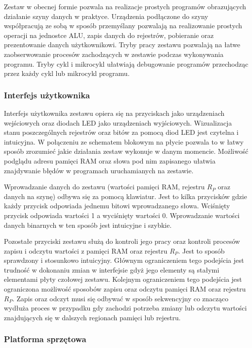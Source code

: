 \documentclass[../main.tex]{subfiles}
\begin{document}
    Zestaw w obecnej formie pozwala na realizacje prostych programów obrazujących działanie szyny danych w praktyce. Urządzenia podłączone do szyny
    współpracują ze sobą w sposób przemyślany pozwalają na realizowanie prostych operacji na jednostce ALU, zapis danych do rejestrów, pobieranie
    oraz prezentowanie danych użytkownikowi. Tryby pracy zestawu pozwalają na łatwe zaobserwowanie procesów zachodzących w zestawie podczas
    wykonywania programu. Tryby cykl i mikrocykl ułatwiają debugowanie programów przechodząc przez każdy cykl lub mikrocykl programu.

    \subsubsection{Interfejs użytkownika}

    Interfejs użytkownika zestawu opiera się na przyciskach jako urządzeniach wejściowych oraz diodach LED jako urządzeniach wyjściowych. Wizualizacja
    stanu poszczególnych rejestrów oraz bitów za pomocą diod LED jest czytelna i intuicyjna. W połączeniu ze schematem blokowym na płycie pozwala
    to w łatwy sposób zrozumieć jakie działania zestaw wykonuje w danym momencie. Możliwość podglądu adresu pamięci RAM oraz słowa 
    pod nim zapisanego ułatwia znajdywanie błędów w programach uruchamianych na zestawie.
    \par
    Wprowadzanie danych do zestawu (wartości pamięci RAM, rejestru $R_P$ oraz danych na szynę) odbywa się za pomocą klawiatur. Jest to kilka przycisków
    gdzie każdy przycisk odpowiada jednemu bitowi wprowadzanego słowa. Wciśnięty przycisk odpowiada wartości 1 a wyciśnięty wartości 0.
    Wprowadzanie wartości danych binarnych w ten sposób jest intuicyjne i szybkie.
    \par
    Pozostałe przyciski zestawu służą do kontroli jego pracy oraz kontroli procesów zapisu i odczytu wartości z pamięci RAM oraz rejestru $R_P$.
    Jest to sposób sprawdzony i stosunkowo intuicyjny. Głównym ograniczeniem tego podejścia jest trudność w dokonaniu zmian w interfejsie gdyż
    jego elementy są stałymi elementami płyty czołowej zestawu. Kolejnym ograniczeniem tego podejścia jest ograniczona możliwość sposobów zapisu oraz 
    odczytu pamięci RAM oraz rejestru $R_P$. Zapis oraz odczyt musi się odbywać w sposób sekwencyjny co znacząco wydłuża proces w przypadku gdy 
    zachodzi potrzeba zmiany lub odczytu wartości znajdujących się w dalszych regionach pamięci lub rejestru.

    \subsubsection{Platforma sprzętowa}
\end{document}
